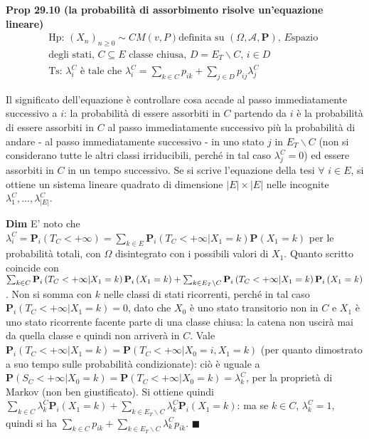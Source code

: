 \documentclass{article}
\begin{document}
\textbf{Prop 29.10 (la probabilit\`{a} di assorbimento risolve un'equazione
lineare)}%
\begin{gather*}
\text{Hp: }\left( X_{n}\right) _{n\geq 0}\sim CM\left( v,P\right) \text{
definita su }\left( \Omega ,\mathcal{A},\mathbf{P}\right) \text{, }E\text{
spazio } \\
\text{degli stati, }C\subseteq E\text{ classe chiusa, }D=E_{T}\backslash C%
\text{, }i\in D \\
\text{Ts: }\lambda _{i}^{C}\text{ \`{e} tale che }\lambda
_{i}^{C}=\sum_{k\in C}p_{ik}+\sum_{j\in D}p_{ij}\lambda _{j}^{C}
\end{gather*}

Il significato dell'equazione \`{e} controllare cosa accade al passo
immediatamente successivo a $i$: la probabilit\`{a} di essere assorbiti in $%
C $ partendo da $i$ \`{e} la probabilit\`{a} di essere assorbiti in $C$ al
passo immediatamente successivo pi\`{u} la probabilit\`{a} di andare - al
passo immediatamente successivo - in uno stato $j$ in $E_{T}\backslash C$
(non si considerano tutte le altri classi irriducibili, perch\'{e} in tal
caso $\lambda _{j}^{C}=0$) ed essere assorbiti in $C$ in un tempo
successivo. Se si scrive l'equazione della tesi $\forall $ $i\in E$, si
ottiene un sistema lineare quadrato di dimensione $\left\vert E\right\vert
\times \left\vert E\right\vert $ nelle incognite $\lambda
_{1}^{C},...,\lambda _{\left\vert E\right\vert }^{C}$.

\textbf{Dim} E' noto che $\lambda _{i}^{C}=\mathbf{P}_{i}\left(
T_{C}<+\infty \right) =\sum_{k\in E}\mathbf{P}_{i}\left( T_{C}<+\infty
|X_{1}=k\right) \mathbf{P}\left( X_{1}=k\right) $ per le probabilit\`{a}
totali, con $\Omega $ disintegrato con i possibili valori di $X_{1}$. Quanto
scritto coincide con $\sum_{k\in C}\mathbf{P}_{i}\left( T_{C}<+\infty
|X_{1}=k\right) \mathbf{P}_{i}\left( X_{1}=k\right) +\sum_{k\in
E_{T}\backslash C}\mathbf{P}_{i}\left( T_{C}<+\infty |X_{1}=k\right) \mathbf{%
P}_{i}\left( X_{1}=k\right) $. Non si somma con $k$ nelle classi di stati
ricorrenti, perch\'{e} in tal caso $\mathbf{P}_{i}\left( T_{C}<+\infty
|X_{1}=k\right) =0$, dato che $X_{0}$ \`{e} uno stato transitorio non in $C$
e $X_{1}$ \`{e} uno stato ricorrente facente parte di una classe chiusa: la
catena non uscir\`{a} mai da quella classe e quindi non arriver\`{a} in $C$.
Vale $\mathbf{P}_{i}\left( T_{C}<+\infty |X_{1}=k\right) =\mathbf{P}\left(
T_{C}<+\infty |X_{0}=i,X_{1}=k\right) $ (per quanto dimostrato a suo tempo
sulle probabilit\`{a} condizionate): ci\`{o} \`{e} uguale a $\mathbf{P}%
\left( S_{C}<+\infty |X_{0}=k\right) =\mathbf{P}\left( T_{C}<+\infty
|X_{0}=k\right) =\lambda _{k}^{C}$, per la propriet\`{a} di Markov (non ben
giustificato). Si ottiene quindi $\sum_{k\in C}\lambda _{k}^{C}\mathbf{P}%
_{i}\left( X_{1}=k\right) +\sum_{k\in E_{T}\backslash C}\lambda _{k}^{C}%
\mathbf{P}_{i}\left( X_{1}=k\right) $: ma se $k\in C$, $\lambda _{k}^{C}=1$,
quindi si ha $\sum_{k\in C}p_{ik}+\sum_{k\in E_{T}\backslash C}\lambda
_{k}^{C}p_{ik}$. $\blacksquare $
\end{document}
